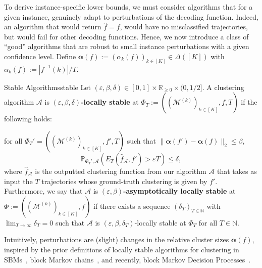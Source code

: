 \documentclass[twoside]{article}
\def\gA{{\mathcal{A}}}
\def\gM{{\mathcal{M}}}
\def\sN{{\mathbb{N}}}
\def\sP{{\mathbb{P}}}
\def\sR{{\mathbb{R}}}
\theoremstyle{plain}
\begin{document}
To derive instance-specific lower bounds, we must consider algorithms that for a given instance, genuinely adapt to perturbations of the decoding function. Indeed, an algorithm that would return $\widehat{f}=f$, would have no misclassified trajectories, but would fail for other decoding functions. Hence, we now introduce a class of ``good'' algorithms that are robust to small instance perturbations with a given confidence level. Define $\bm\alpha(f) := (\alpha_k(f))_{k \in [K]} \in \Delta([K])$ with $\alpha_k(f) := |f^{-1}(k)| / T$.

\begin{definition}{Stable Algorithms}{stable}
    Let $(\varepsilon, \beta, \delta) \in [0, 1] \times \sR_{\geq 0} \times (0, 1/2]$.
    A clustering algorithm $\gA$ is {\bf $(\varepsilon, \beta, \delta)$-locally stable} at $\Phi_T := ((\gM^{(k)})_{k \in [K]}, f, T)$ if the following holds: 
    
    for all $\Phi_T'=((\gM^{(k)})_{k \in [K]}, f', T)$ such that $\lVert \bm\alpha(f') - \bm\alpha(f) \rVert_2 \leq \beta$,
    \begin{equation}
    \label{eqn:stability}
        \sP_{\Phi_T', \gA} \left( E_T(\widehat{f}_\gA, f') > \varepsilon T \right) \leq \delta,
    \end{equation}
    where $\widehat{f}_\gA$ is the outputted clustering function from our algorithm $\gA$ that takes as input the $T$ trajectories whose ground-truth clustering is given by $f'$.
    Furthermore, we say that $\gA$ is {\bf $(\varepsilon, \beta)$-asymptotically locally stable} at $\Phi := ((\gM^{(k)})_{k \in [K]}, f)$ if there exists a sequence $(\delta_T)_{T \in \sN}$ with $\lim_{T \rightarrow \infty} \delta_T = 0$ such that $\gA$ is $(\varepsilon, \beta, \delta_T)$-locally stable at $\Phi_T$ for all $T \in \sN$.
\end{definition}
Intuitively, perturbations are (slight) changes in the relative cluster sizes $\bm\alpha(f)$, inspired by the prior definitions of locally stable algorithms for clustering in SBMs~\citep[Definition 1]{yun2019optimal}, block Markov chains~\citep{sanders2020bmc}, and recently, block Markov Decision Processes~\citep{jedra2023bmdp}.
\end{document}
